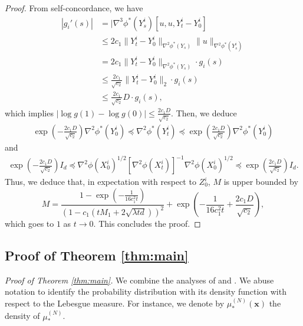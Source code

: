 \documentclass{article}
\begin{document}
\begin{proof}
From self-concordance, we have \begin{align*}
    |g_i'(s)| &= |\nabla^3\phi^*(Y_s^i)[u,u,Y_t^i-Y_0^i]\\
    &\le 2c_1\|Y_t^i-Y_0^i\|_{\nabla^2\phi^*(Y_s)}\|u\|_{\nabla^2\phi^*(Y_s^i)}\\
    &= 2c_1\|Y_t^i-Y_0^i\|_{\nabla^2\phi^*(Y_s)}\cdot g_i(s)\\
    &\le \frac{2c_1}{\sqrt{c_2}}\|Y_t^i-Y_0^i\|_{2}\cdot g_i(s)\\
    &\le \frac{2c_1}{\sqrt{c_2}}D\cdot g_i(s),
\end{align*}
which implies $|{\log g(1)} - \log g(0)|\le \frac{2c_1D}{\sqrt{c_2}}$. Then, we deduce \begin{align*}
    \exp\left(-\frac{2c_1D}{\sqrt{c_2}}\right)\nabla^2\phi^*(Y_0^i)\preceq \nabla^2\phi^*(Y_t^i)\preceq \exp\left(\frac{2c_1D}{\sqrt{c_2}}\right)\nabla^2\phi^*(Y_0^i)
\end{align*}
and 
\begin{align*}
    \exp\left(-\frac{2c_1D}{\sqrt{c_2}}\right)I_d\preceq \nabla^2\phi(X_0^i)^{1/2}[\nabla^2\phi(X_t^i)]^{-1}\nabla^2\phi(X_0^i)^{1/2}\preceq \exp\left(\frac{2c_1D}{\sqrt{c_2}}\right)I_d.
\end{align*}
Thus, we deduce that, in expectation with respect to $Z_0^i$, $M$ is upper bounded by \[
M = \frac{1-\exp(-\frac{1}{16c_1^2t})}{(1-c_1(tM_1 + 2\sqrt{\lambda td}))^2} + \exp\left(-\frac{1}{16c_1^2t} + \frac{2c_1D}{\sqrt{c_2}}\right),
\]
which goes to $1$ as $t\to 0$. This concludes the proof.
\end{proof}

\subsection{Proof of Theorem \ref{thm:main}}\label{app:thm_main}


\textit{Proof of Theorem \ref{thm:main}.}
We combine the analyses of \citet{jiang2021mirror} and \citet{nitanda2024improved}. We abuse notation to identify the probability distribution with its density function with respect to the Lebesgue measure. For instance, we denote by $\mu_*^{(N)}(\mathbf{x})$ the density of $\mu_*^{(N)}$.
\end{document}
